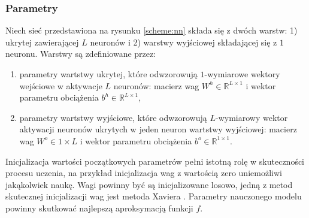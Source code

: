 \documentclass[11pt]{book}
\theoremstyle{definition}
\begin{document}
\subsubsection{Parametry}

Niech sieć przedstawiona na rysunku \ref{scheme:nn} składa się z dwóch warstw: 1) ukrytej zawierającej $L$ neuronów i 2) warstwy wyjściowej składającej się z $1$ neuronu. Warstwy są zdefiniowane przez:

\begin{enumerate}
	\item parametry wartstwy ukrytej, które odwzorowują $1$-wymiarowe wektory wejściowe w aktywacje $L$ neuronów:
	macierz wag $W^h\in\mathbb{R}^{L\times 1	}$ i wektor parametru obciążenia $b^h\in\mathbb{R}^{L\times 1}$,
	\item parametry wartstwy wyjściowe, które odwzorowują $L$-wymiarowy wektor aktywacji neuronów ukrytych w jeden neuron wartstwy wyjściowej:
macierz wag $W^o\in{1\times L}$ i wektor parametru obciążenia $b^o\in\mathbb{R}^{1\times 1}$.	
\end{enumerate}

Inicjalizacja wartości początkowych parametrów pełni istotną rolę w skuteczności procesu uczenia, na przykład inicjalizacja wag z wartością zero uniemożliwi jakąkolwiek naukę. Wagi powinny być są inicjalizowane losowo, jedną z metod skutecznej inicjalizacji wag jest metoda Xaviera \cite{Glorot10understandingthe}. Parametry nauczonego modelu powinny skutkować najlepszą aproksymacją funkcji $f$.
\end{document}
